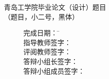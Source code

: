 \documentclass[fontset=adobe, twoside, a4paper]{oucqdc-document}
\makeatletter
\newcommand\unline[2][4cm]{\hskip1pt\underline{\hb@xt@ #1{\hss#2\hss}}\hskip3pt}
\makeatother
\begin{document}
\begin{center}
\xiaoerhao\heiti 青岛工学院毕业论文（设计）题目 \\
\xiaosihao\songti（题目，小二号，黑体）
\begin{figure}[!b]
\setlength{\baselineskip}{35pt}
\xiaosanhao
\begin{tabbing}
 \hspace{5cm}完成日期：\hspace{2cm} \= \unline[6cm]{} \\
 \hspace{5cm}指导教师签字： \> \unline[6cm]{} \\
 \hspace{5cm}评阅教师签字： \> \unline[6cm]{} \\
 \hspace{5cm}答辩小组长签字： \> \unline[6cm]{} \\
 \hspace{5cm}答辩小组成员签字： \> \unline[6cm]{} \\ \\ \\ 
\end{tabbing}
\end{figure}
\end{center}
\end{document}
